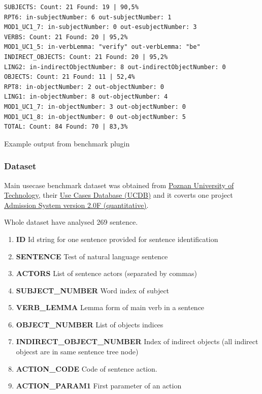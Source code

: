 \begin{table}[ht]   %
\begin{center}
    \begin{verbatim}
SUBJECTS: Count: 21 Found: 19 | 90,5%
RPT6: in-subjectNumber: 6 out-subjectNumber: 1
MOD1_UC1_7: in-subjectNumber: 0 out-esubjectNumber: 3
VERBS: Count: 21 Found: 20 | 95,2%
MOD1_UC1_5: in-verbLemma: "verify" out-verbLemma: "be"
INDIRECT_OBJECTS: Count: 21 Found: 20 | 95,2%
LING2: in-indirectObjectNumber: 8 out-indirectObjectNumber: 0
OBJECTS: Count: 21 Found: 11 | 52,4%
RPT8: in-objectNumber: 2 out-objectNumber: 0
LING1: in-objectNumber: 8 out-objectNumber: 4
MOD1_UC1_7: in-objectNumber: 3 out-objectNumber: 0
MOD1_UC1_8: in-objectNumber: 0 out-objectNumber: 5
TOTAL: Count: 84 Found: 70 | 83,3%   
    \end{verbatim}
  \caption{Example output from benchmark plugin}
  \label{tab.benchmarkexample}
\end{center}
\end{table}   
      
      
\subsubsection{Dataset}

Main usecase benchmark dataset was obtained from \href{http://www2.put.poznan.pl/en}{Poznan University of Technology}, their \href{http://www.se.cs.put.poznan.pl/knowledge-base/software-projects-database/use-cases-database-ucdb/use-cases-database-ucdb}{Use Cases Database (UCDB)} and it coverts one project \href{http://ucdb.cs.put.poznan.pl/benchmark/2.f.n/srs/index.html}{Admission System version 2.0F (quantitative)}.  

Whole dataset have analysed 269 sentence.    

\begin{enumerate}
\item {\bf ID } Id string for one sentence provided for sentence identification
\item {\bf SENTENCE } Test of natural language sentence
\item {\bf ACTORS } List of sentence actors (separated by commas)
\item {\bf SUBJECT\_NUMBER } Word index of subject
\item {\bf VERB\_LEMMA } Lemma form of main verb in a sentence
\item {\bf OBJECT\_NUMBER} List of objects indices
\item {\bf INDIRECT\_OBJECT\_NUMBER} Index of indirect objects (all indirect objecst are in same sentence tree node)
\item {\bf ACTION\_CODE} Code of sentence action. 
\item {\bf ACTION\_PARAM1} First parameter of an action
\end{enumerate}   
   

